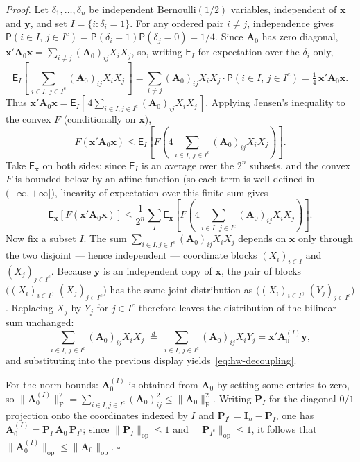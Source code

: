 \documentclass[12pt,a4paper]{article}
\makeatletter
\theoremstyle{definition}
\renewenvironment{proof}[1][\proofname]{\par
  \pushQED{\qed}%
  \normalfont \topsep6\p@\@plus6\p@\relax
  \trivlist
  \item[\hskip\labelsep\bfseries #1\@addpunct{.}]\ignorespaces
}{%
  \popQED\endtrivlist\@endpefalse
}
\newcommand\expc{\mathsf{E}}
\newcommand\prb{\mathsf{P}}
\newcommand{\by}{\mathbf{y}}
\newcommand{\bx}{\mathbf{x}}
\newcommand{\bI}{\mathbf{I}}
\newcommand{\bA}{\mathbf{A}}
\newcommand{\bP}{\mathbf{P}}
\newcommand{\opnorm}[1]{\|#1\|_{\mathrm{op}}}
\newcommand{\fnorm}[1]{\|#1\|_{\mathrm{F}}}
\makeatother
\begin{document}
\begin{proof}
\emph{Proof.} Let $\delta_1, \ldots, \delta_n$ be independent $\mathrm{Bernoulli}(1/2)$ variables, independent of $\bx$ and $\by$, and set $I = \{i : \delta_i = 1\}$. For any ordered pair $i \neq j$, independence gives $\prb(i \in I,\, j \in I^c) = \prb(\delta_i = 1)\prb(\delta_j = 0) = 1/4$. Since $\bA_0$ has zero diagonal, $\bx'\bA_0\bx = \sum_{i \neq j}(\bA_0)_{ij}X_iX_j$, so, writing $\expc_I$ for expectation over the $\delta_i$ only,
\[
\expc_I\!\left[\,\sum_{i \in I,\, j \in I^c}(\bA_0)_{ij}X_iX_j\,\right] = \sum_{i \neq j}(\bA_0)_{ij}X_iX_j \cdot \prb(i \in I,\, j \in I^c) = \tfrac{1}{4}\,\bx'\bA_0\bx.
\]
Thus $\bx'\bA_0\bx = \expc_I[\,4\sum_{i \in I, j \in I^c}(\bA_0)_{ij}X_iX_j\,]$. Applying Jensen's inequality to the convex $F$ (conditionally on $\bx$),
\[
F(\bx'\bA_0\bx) \leqslant \expc_I\!\left[F\!\left(4\sum_{i \in I,\, j \in I^c}(\bA_0)_{ij}X_iX_j\right)\right].
\]
Take $\expc_\bx$ on both sides; since $\expc_I$ is an average over the $2^n$ subsets, and the convex $F$ is bounded below by an affine function (so each term is well-defined in $(-\infty, +\infty]$), linearity of expectation over this finite sum gives
\[
\expc_\bx[F(\bx'\bA_0\bx)] \leqslant \frac{1}{2^n}\sum_I \expc_\bx\!\left[F\!\left(4\sum_{i \in I,\, j \in I^c}(\bA_0)_{ij}X_iX_j\right)\right].
\]
Now fix a subset $I$. The sum $\sum_{i \in I, j \in I^c}(\bA_0)_{ij}X_iX_j$ depends on $\bx$ only through the two disjoint --- hence independent --- coordinate blocks $(X_i)_{i \in I}$ and $(X_j)_{j \in I^c}$. Because $\by$ is an independent copy of $\bx$, the pair of blocks $\big((X_i)_{i \in I},\, (X_j)_{j \in I^c}\big)$ has the same joint distribution as $\big((X_i)_{i \in I},\, (Y_j)_{j \in I^c}\big)$. Replacing $X_j$ by $Y_j$ for $j \in I^c$ therefore leaves the distribution of the bilinear sum unchanged:
\[
\sum_{i \in I,\, j \in I^c}(\bA_0)_{ij}X_iX_j \;\overset{d}{=}\; \sum_{i \in I,\, j \in I^c}(\bA_0)_{ij}X_iY_j = \bx'\bA_0^{(I)}\by,
\]
and substituting into the previous display yields~\eqref{eq:hw-decoupling}.

For the norm bounds: $\bA_0^{(I)}$ is obtained from $\bA_0$ by setting some entries to zero, so $\fnorm{\bA_0^{(I)}}^2 = \sum_{i \in I, j \in I^c}(\bA_0)_{ij}^2 \leqslant \fnorm{\bA_0}^2$. Writing $\bP_I$ for the diagonal $0/1$ projection onto the coordinates indexed by $I$ and $\bP_{I^c} = \bI_n - \bP_I$, one has $\bA_0^{(I)} = \bP_I\,\bA_0\,\bP_{I^c}$; since $\opnorm{\bP_I} \leqslant 1$ and $\opnorm{\bP_{I^c}} \leqslant 1$, it follows that $\opnorm{\bA_0^{(I)}} \leqslant \opnorm{\bA_0}$. \hfill$\square$


\end{proof}
\end{document}
